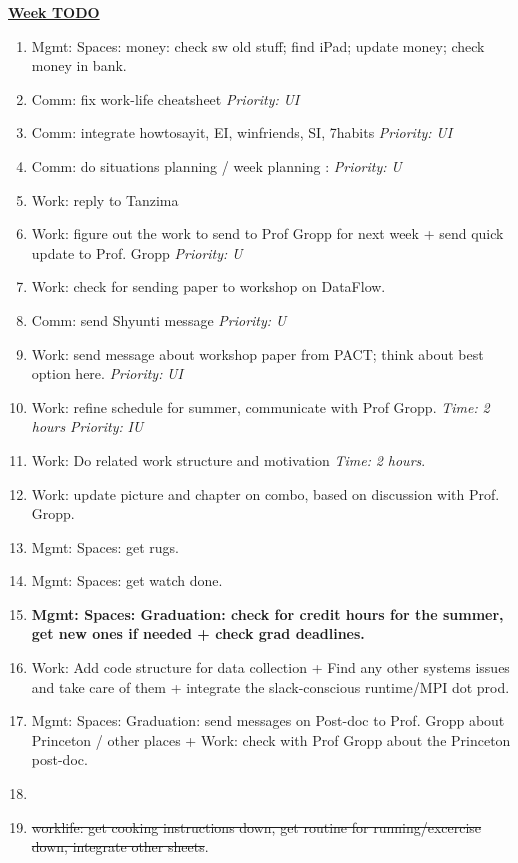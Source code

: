 \documentclass[serif,mathserif,final]{beamer}
\newcommand{\doneTask}[1]{\item \sout{#1}}
\newcommand{\timeEst}[1]{\textit{Time:} \textit{#1}}
\newcommand{\priority}[1]{\textit{Priority:} \textit{#1}}
\begin{document}
\begin{frame}{}
\begin{columns}[t]
\begin{column}{0.33\linewidth}{\textbf{\underline{Week TODO}}}
\begin{block}
\begin{enumerate}
\item \tiny Mgmt: Spaces: money: check sw old stuff; find iPad; update money; check money in bank. 

\item \tiny Comm: fix work-life cheatsheet \priority{UI} 
\item \tiny Comm: integrate howtosayit, EI, winfriends, SI, 7habits \priority{UI} 
\item \tiny Comm: do situations planning / week planning : \priority{U} 
\item \tiny  Work: reply to Tanzima 
\item \tiny Work: figure out the work to send to Prof Gropp for next week + 
send quick update to Prof. Gropp \priority{U} 
\item  \tiny Work: check for sending paper to workshop on DataFlow.  
\item \tiny Comm: send Shyunti message \priority{U} 

\item \tiny Work: send message about workshop paper from PACT; think
  about best option here. \priority{UI} 

\item \tiny Work: refine schedule for summer, communicate with Prof
  Gropp. \timeEst{2 hours} \priority{IU} 

\item \tiny Work: Do related work structure and motivation \timeEst{2 hours}. 
\item \tiny Work: update picture and chapter on combo, based on discussion with Prof. Gropp. 
\item \tiny Mgmt: Spaces: get rugs. 

\item \tiny Mgmt: Spaces: get watch done. 

\item \tiny \textbf{Mgmt: Spaces: Graduation: check for credit hours 
for the summer, get new ones if needed + check grad deadlines.} 

\item \tiny Work: Add code structure for data collection + Find
  any other systems issues and take care of them + integrate the
  slack-conscious runtime/MPI dot prod. 
\item \tiny Mgmt: Spaces: Graduation: send messages on Post-doc to
  Prof. Gropp about Princeton / other places +  Work: check with Prof Gropp about the Princeton post-doc. 

\item \tiny \doneTask{worklife: get cooking instructions down, get
  routine for running/excercise down, integrate other sheets}. 


\end{enumerate}
\end{block}
\end{column}
\end{columns}
\end{frame}
\end{document}
